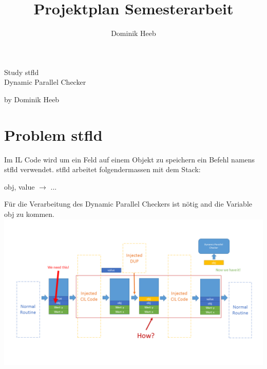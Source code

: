 \documentclass[10pt,a4paper]{article}
\author{Dominik Heeb}
\title{Projektplan Semesterarbeit}
\begin{document}
\begin{titlepage}
	\begin{Huge}
		\begin{center}
				Study stfld \\Dynamic Parallel Checker\\[2.0cm]
		\end{center}
	\end{Huge}
	
	\begin{center}
		\begin{Large}
				by Dominik Heeb\\[1.0cm]
		\end{Large}
	\end{center}
\end{titlepage}

\newpage
\tableofcontents 
\newpage

\section{Problem stfld}
\begin{flushleft}
Im IL Code wird um ein Feld auf einem Objekt zu speichern ein Befehl namens stfld verwendet.
stfld arbeitet folgendermassen mit dem Stack:  \\
\begin{center}\begin{Large}
obj, value $\rightarrow$ ...
\end{Large}\end{center}
Für die Verarbeitung des Dynamic Parallel Checkers ist nötig and die Variable obj zu kommen.
\includegraphics[width=16cm,height=7.5cm,trim=10mm 10mm 0mm 20mm, clip]{pictures/StudyStfld.png}
\end{flushleft}
\end{document}
